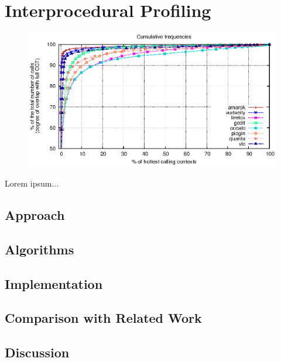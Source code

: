 \section{Interprocedural Profiling}

\ifdefined\noauthorea
\begin{figure}[hb]
\begin{center}
\includegraphics[width=0.95\columnwidth]{figures/hcct-skewness/hcct-skewness.eps}
\caption{\protect}
\end{center}
\end{figure}
\fi

Lorem ipsum...


\subsection{Approach}

\subsection{Algorithms}

\subsection{Implementation}

\subsection{Comparison with Related Work}

\subsection{Discussion}
